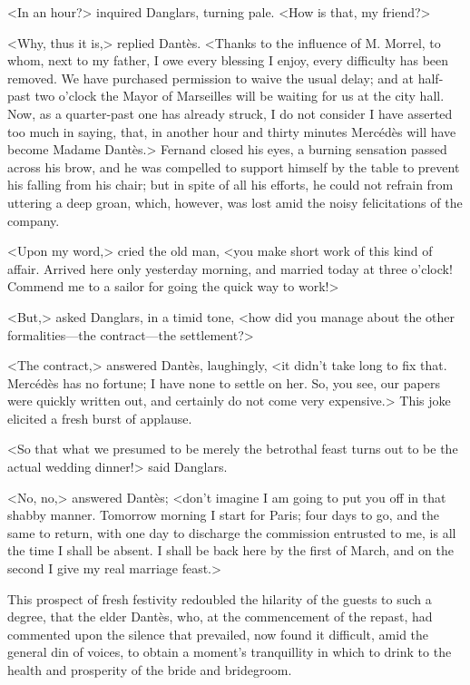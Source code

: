  <In an hour?> inquired Danglars, turning pale. <How is that, my friend?> 

 <Why, thus it is,> replied Dantès. <Thanks to the influence of M. Morrel, to whom, next to my father, I owe every blessing I enjoy, every difficulty has been removed. We have purchased permission to waive the usual delay; and at half-past two o'clock the Mayor of Marseilles will be waiting for us at the city hall. Now, as a quarter-past one has already struck, I do not consider I have asserted too much in saying, that, in another hour and thirty minutes Mercédès will have become Madame Dantès.>  Fernand closed his eyes, a burning sensation passed across his brow, and he was compelled to support himself by the table to prevent his falling from his chair; but in spite of all his efforts, he could not refrain from uttering a deep groan, which, however, was lost amid the noisy felicitations of the company. 

 <Upon my word,> cried the old man, <you make short work of this kind of affair. Arrived here only yesterday morning, and married today at three o'clock! Commend me to a sailor for going the quick way to work!> 

 <But,> asked Danglars, in a timid tone, <how did you manage about the other formalities—the contract—the settlement?> 

 <The contract,> answered Dantès, laughingly, <it didn't take long to fix that. Mercédès has no fortune; I have none to settle on her. So, you see, our papers were quickly written out, and certainly do not come very expensive.> This joke elicited a fresh burst of applause. 

 <So that what we presumed to be merely the betrothal feast turns out to be the actual wedding dinner!> said Danglars. 

 <No, no,> answered Dantès; <don't imagine I am going to put you off in that shabby manner. Tomorrow morning I start for Paris; four days to go, and the same to return, with one day to discharge the commission entrusted to me, is all the time I shall be absent. I shall be back here by the first of March, and on the second I give my real marriage feast.> 

 This prospect of fresh festivity redoubled the hilarity of the guests to such a degree, that the elder Dantès, who, at the commencement of the repast, had commented upon the silence that prevailed, now found it difficult, amid the general din of voices, to obtain a moment's tranquillity in which to drink to the health and prosperity of the bride and bridegroom. 

